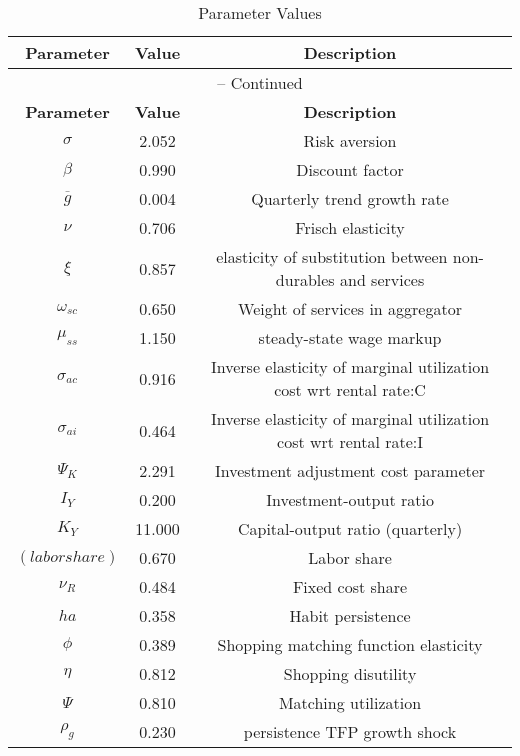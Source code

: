 \begin{center}
\begin{longtable}{ccc}
\caption{Parameter Values}\\%
\toprule%
\multicolumn{1}{c}{\textbf{Parameter}} &
\multicolumn{1}{c}{\textbf{Value}} &
 \multicolumn{1}{c}{\textbf{Description}}\\%
\midrule%
\endfirsthead
\multicolumn{3}{c}{{\tablename} \thetable{} -- Continued}\\%
\midrule%
\multicolumn{1}{c}{\textbf{Parameter}} &
\multicolumn{1}{c}{\textbf{Value}} &
  \multicolumn{1}{c}{\textbf{Description}}\\%
\midrule%
\endhead
${\sigma}$ 	 & 	 2.052 	 & 	 Risk aversion\\
${\beta}$ 	 & 	 0.990 	 & 	 Discount factor\\
${\overline{g}}$ 	 & 	 0.004 	 & 	 Quarterly trend growth rate\\
$\nu$ 	 & 	 0.706 	 & 	 Frisch elasticity\\
$\xi$ 	 & 	 0.857 	 & 	 elasticity of substitution between non-durables and services\\
$\omega_{sc}$ 	 & 	 0.650 	 & 	 Weight of services in aggregator\\
$\mu_{ss}$ 	 & 	 1.150 	 & 	 steady-state wage markup\\
${\sigma_{ac}}$ 	 & 	 0.916 	 & 	 Inverse elasticity of marginal utilization cost wrt rental rate:C\\
${\sigma_{ai}}$ 	 & 	 0.464 	 & 	 Inverse elasticity of marginal utilization cost wrt rental rate:I\\
${\Psi_{K}}$ 	 & 	 2.291 	 & 	 Investment adjustment cost parameter\\
${I_Y}$ 	 & 	 0.200 	 & 	 Investment-output ratio\\
${K_Y}$ 	 & 	 11.000 	 & 	 Capital-output ratio (quarterly)\\
$(labor share)$ 	 & 	 0.670 	 & 	 Labor share\\
${\nu_R}$ 	 & 	 0.484 	 & 	 Fixed cost share\\
${ha}$ 	 & 	 0.358 	 & 	 Habit persistence\\
${\phi}$ 	 & 	 0.389 	 & 	 Shopping matching function elasticity\\
${\eta}$ 	 & 	 0.812 	 & 	 Shopping disutility\\
${\Psi}$ 	 & 	 0.810 	 & 	 Matching utilization\\
${\rho_g}$ 	 & 	 0.230 	 & 	 persistence TFP growth shock\\

\end{longtable}
\end{center}
